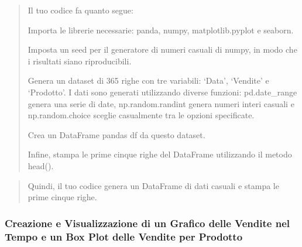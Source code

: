 \documentclass[11pt]{article}
\begin{document}
    \begin{quote}
Il tuo codice fa quanto segue:

Importa le librerie necessarie: panda, numpy, matplotlib.pyplot e
seaborn.

Imposta un seed per il generatore di numeri casuali di numpy, in modo
che i risultati siano riproducibili.

Genera un dataset di 365 righe con tre variabili: `Data', `Vendite' e
`Prodotto'. I dati sono generati utilizzando diverse funzioni:
pd.date\_range genera una serie di date, np.random.randint genera numeri
interi casuali e np.random.choice sceglie casualmente tra le opzioni
specificate.

Crea un DataFrame pandas df da questo dataset.

Infine, stampa le prime cinque righe del DataFrame utilizzando il metodo
head().
\end{quote}

\begin{quote}
Quindi, il tuo codice genera un DataFrame di dati casuali e stampa le
prime cinque righe.
\end{quote}

    \subsubsection{Creazione e Visualizzazione di un Grafico delle Vendite
nel Tempo e un Box Plot delle Vendite per
Prodotto}\label{creazione-e-visualizzazione-di-un-grafico-delle-vendite-nel-tempo-e-un-box-plot-delle-vendite-per-prodotto}
\end{document}
